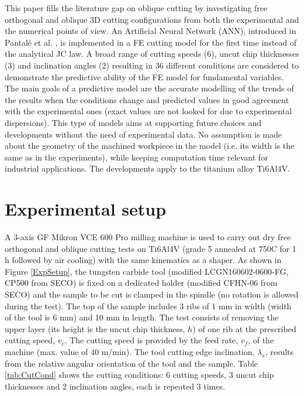 \documentclass[preprint,12pt,times]{elsarticle}
\begin{document}
This paper fills the literature gap on oblique cutting by investigating free orthogonal and oblique 3D cutting configurations from both the experimental and the numerical points of view. An Artificial Neural Network (ANN), introduced in Pantalé et al. \cite{pantale_Efficient_2022}, is implemented in a FE cutting model for the first time instead of the analytical JC law. A broad range of cutting speeds (6), uncut chip thicknesses (3) and inclination angles (2) resulting in 36 different conditions are considered to demonstrate the predictive ability of the FE model for fundamental variables. The main goals of a predictive model are the accurate modelling of the trends of the results when the conditions change and predicted values in good agreement with the experimental ones (exact values are not looked for due to experimental dispersions). This type of models aims at supporting future choices and developments without the need of experimental data. No assumption is made about the geometry of the machined workpiece in the model (i.e. its width is the same as in the experiments), while keeping computation time relevant for industrial applications. The developments apply to the titanium alloy Ti6Al4V.

\section{Experimental setup}
\label{ExpSet}

A 3-axis GF Mikron VCE 600 Pro milling machine is used to carry out dry free orthogonal and oblique cutting tests on Ti6Al4V (grade 5 annealed at 750\textdegree{}C for 1 h followed by air cooling) with the same kinematics as a shaper. As shown in Figure \ref{ExpSetup}, the tungsten carbide tool (modified LCGN160602-0600-FG, CP500 from SECO) is fixed on a dedicated holder (modified CFHN-06 from SECO) and the sample to be cut is clamped in the spindle (no rotation is allowed during the test). The top of the sample includes 3 ribs of 1 mm in width (width of the tool is 6 mm) and 10 mm in length. The test consists of removing the upper layer (its height is the uncut chip thickness, $h$) of one rib at the prescribed cutting speed, $v_c$. The cutting speed is provided by the feed rate, $v_f$, of the machine (max. value of 40 m/min). The tool cutting edge inclination, $\lambda_s$, results from the relative angular orientation of the tool and the sample. Table \ref{tab:CutCond} shows the cutting conditions: 6 cutting speeds, 3 uncut chip thicknesses and 2 inclination angles, each is repeated 3 times.
\end{document}
